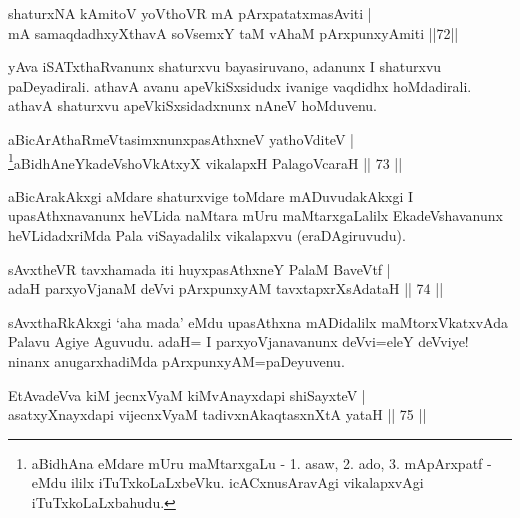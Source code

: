 
\begin{shl}
shaturxNA kAmitoV yoV\s thoVR mA pArxpatatxmasAviti | \\
mA samaqdadhxyXthavA soV\s semxY taM vA\s haM pArxpunxyAmiti \hfill||72|| 
\end{shl}

\begin{artha} 
yAva iSATxthaRvanunx shaturxvu bayasiruvano, adanunx I shaturxvu 
paDeyadirali. athavA avanu apeVkiSxsidudx ivanige vaqdidhx 
hoMdadirali. athavA shaturxvu apeVkiSxsidadxnunx nAneV hoMduvenu.
\end{artha}


\begin{shl}
aBicArAthaRmeVtasimxnunxpasAthxneV yathoVditeV | \\
\footnote{aBidhAna eMdare mUru maMtarxgaLu - 1. asaw, 2. ado, 3. mApArxpatf - eMdu ililx iTuTxkoLaLxbeVku. icACxnusAravAgi vikalapxvAgi iTuTxkoLaLxbahudu.}aBidhAneYkadeVshoVkAtxyX vikalapxH PalagoVcaraH \hfill||  73 || 
\end{shl}

\begin{artha} 
aBicArakAkxgi aMdare shaturxvige toMdare mADuvudakAkxgi I 
upasAthxnavanunx heVLida naMtara mUru maMtarxgaLalilx EkadeVshavanunx 
heVLidadxriMda Pala viSayadalilx vikalapxvu (eraDAgiruvudu).
\end{artha}


\begin{shl}
sAvxtheVR tavxhamada iti huyxpasAthxneY PalaM BaveVtf | \\
adaH parxyoVjanaM deVvi pArxpunxyAM tavxtapxrXsAdataH \hfill||  74 || 
\end{shl}

\begin{artha} 
sAvxthaRkAkxgi `aha mada' eMdu upasAthxna mADidalilx maMtorxVkatxvAda 
Palavu Agiye Aguvudu. adaH= I parxyoVjanavanunx deVvi=eleY deVviye! 
ninanx anugarxhadiMda pArxpunxyAM=\break paDeyuvenu.
\end{artha}


\begin{shl}
EtAvadeVva kiM jecnxVyaM kiMvA\s nayxdapi shiSayxteV | \\
asatxyXnayxdapi vijecnxVyaM tadivxnA\s kaqtasxnXtA yataH \hfill||  75 || 
\end{shl}

